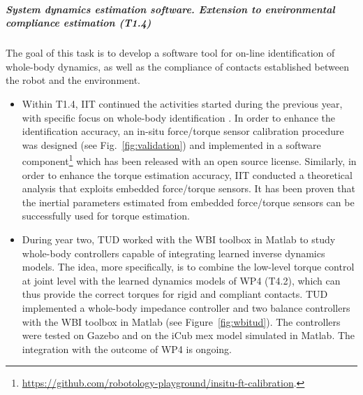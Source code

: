 
\subparagraph{System dynamics estimation software. Extension to
environmental compliance estimation (T1.4)}

The goal of this task is to develop a software tool for on-line identification
of whole-body dynamics, as well as the compliance of contacts established
between the robot and the environment.

\begin{itemize}
\item Within T1.4, IIT continued the activities started during the previous
  year, with specific focus on whole-body identification \cite{Traversaro2013,
    Traversaro2014}.  In order to enhance the identification accuracy, an
  in-situ force/torque sensor calibration procedure was designed
  \cite{Traversaro2015b} (see Fig.~\ref{fig:validation}) and implemented in a
  software
  component\footnote{\url{https://github.com/robotology-playground/insitu-ft-calibration}.}
  which has been released with an open source license.  Similarly, in order to
  enhance the torque estimation accuracy, IIT conducted a theoretical analysis
  that exploits embedded force/torque sensors.  It has been proven
  \cite{Traversaro2015} that the inertial parameters estimated from embedded
  force/torque sensors can be successfully used for torque estimation.
\item During year two, TUD worked with the WBI toolbox in Matlab to study
  whole-body controllers capable of integrating learned inverse dynamics
  models.  The idea, more specifically, is to combine the low-level torque
  control at joint level with the learned dynamics models of WP4 (T4.2), which
  can thus provide the correct torques for rigid and compliant contacts.  TUD
  implemented a whole-body impedance controller and two balance controllers
  with the WBI toolbox in Matlab (see Figure~\ref{fig:wbitud}).  The
  controllers were tested on Gazebo and on the iCub mex model simulated in
  Matlab.  The integration with the outcome of WP4 is ongoing.
\end{itemize}

